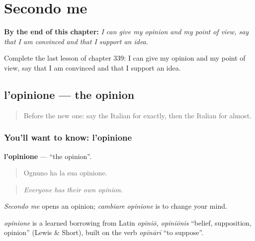 
\chapter{Secondo me}
\label{ch:it-secondo-me}

\begin{chapteropening}
\textbf{By the end of this chapter:} \emph{I can give my opinion and my point of view, say that I am convinced and that I support an idea.}

Complete the last lesson of chapter 339: I can give my opinion and my point of view, say that I am convinced and that I support an idea.
\end{chapteropening}

\section[l'opinione]{l'opinione — the opinion}

\label{lesson:IT-C339-opinione}



\begin{quote}
Before the new one: say the Italian for exactly, then the Italian for almost.
\end{quote}

\subsection*{You'll want to know: l'opinione}
\textbf{l'opinione} — \textquotedblleft{}the opinion\textquotedblright{}.

\begin{quote}
Ognuno ha la sua opinione.
\end{quote}

\begin{quote}
\emph{Everyone has their own opinion.}
\end{quote}

\emph{Secondo me} opens an opinion; \emph{cambiare opinione} is to change your mind.

\begin{cousinweb}
\emph{opinione} is a learned borrowing from Latin \emph{opīniō, opīniōnis} \textquotedblleft{}belief, supposition, opinion\textquotedblright{} (Lewis \& Short), built on the verb \emph{opīnārī} \textquotedblleft{}to suppose\textquotedblright{}.
\end{cousinweb}

